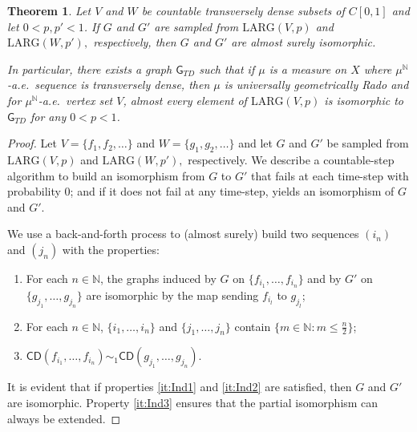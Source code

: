 \documentclass{daj}
\newtheorem{thm}{Theorem}
\newcommand{\LARG}{\mathrm{LARG}}
\newcommand{\N}{\mathbb N}
\newcommand{\CD}{\mathsf{CD}}
\begin{document}
\begin{thm}\label{thm:TD}
Let $V$ and $W$ be countable transversely dense subsets of $C[0,1]$ and let $0<p,p'<1$.
If $G$ and $G'$ are sampled from $\LARG(V,p)$ and $\LARG(W,p'),$ respectively,
then $G$ and $G'$ are almost surely isomorphic.

In particular, there exists a graph $\mathsf G_{TD}$ such that
if $\mu$ is a measure on $X$ where $\mu^\N$-a.e.\ sequence is
transversely dense, then $\mu$ is universally geometrically Rado
and for $\mu^\N$-a.e.\ vertex set $V$, almost every element of
$\LARG(V,p)$ is isomorphic to $\mathsf G_{TD}$ for any $0<p<1$.
\end{thm}

\begin{proof}
Let $V=\{f_1,f_2,\ldots\}$ and $W=\{g_1,g_2,\ldots\}$ and let $G$ and $G'$ be sampled from
$\LARG(V,p)$ and $\LARG(W,p'),$ respectively. We describe a
countable-step algorithm to build an isomorphism
from $G$ to $G'$ that fails at each time-step with probability 0; and if it does not fail at any time-step,
yields an isomorphism of $G$ and $G'$.

We use a back-and-forth process to (almost surely) build two sequences
$(i_n)$ and $(j_n)$ with the properties:
\begin{enumerate}[label=(T\ref{thm:TD}-\arabic*)]
\item\label{it:Ind1}
For each $n\in\N$, the graphs induced by $G$ on $\{f_{i_1},\ldots,f_{i_n}\}$ and
by $G'$ on $\{g_{j_1},\ldots,g_{j_n}\}$ are isomorphic by the map sending $f_{i_l}$ to $g_{j_l}$;
\item \label{it:Ind2}For each $n\in \N$, $\{i_1,\ldots,i_n\}$ and
$\{j_1,\ldots,j_n\}$ contain $\{m\in\N\colon m\le \frac n2\}$;
\item \label{it:Ind3}$\CD(f_{i_1},\ldots,f_{i_n})\sim_1 \CD(g_{j_1},\ldots,g_{j_n})$.
\end{enumerate}
It is evident that if properties \ref{it:Ind1} and \ref{it:Ind2} are satisfied, then $G$ and $G'$ are isomorphic.
Property \ref{it:Ind3} ensures that the partial isomorphism can always be extended.


\end{proof}
\end{document}
